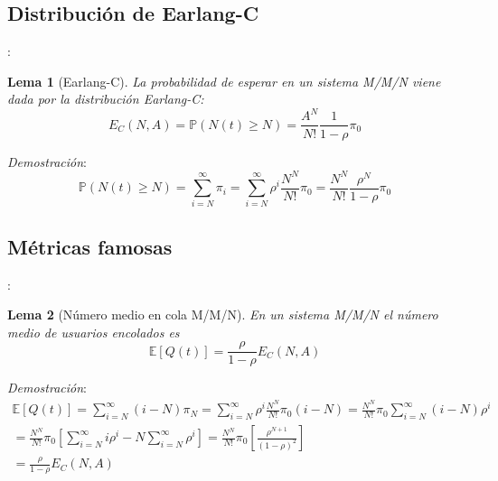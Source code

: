 \documentclass[xcolor={x11names}]{beamer}
\newtheorem{lema}{Lema}[section]
\begin{document}
\subsection{Distribución de Earlang-C}
\begin{frame}{\secname: \subsecname}
    \begin{lema}[Earlang-C]
        La probabilidad de esperar en un
        sistema M/M/N viene dada por
        la distribución Earlang-C:
        \begin{equation}
            E_C(N,A)=\mathbb{P}(N(t)\geq N)
            = \frac{A^N}{N!}\frac{1}{1-\rho}\pi_0
        \end{equation}
    \end{lema}
    \begin{figure}
        \resizebox{!}{.2\textwidth}{%
            
        }
    \end{figure}
    \vfill
    \textit{Demostración}:
        \begin{equation}
            \mathbb{P}(N(t)\geq N)=
            \sum_{i=N}^{\infty}\pi_i
            = \sum_{i=N}^{\infty}
            \rho^i \frac{N^N}{N!}\pi_0
            = \frac{N^N}{N!}\frac{\rho^N}{1-\rho}\pi_0
        \end{equation}
\end{frame}




\subsection{Métricas famosas}
\begin{frame}{\secname: \subsecname}
    \begin{lema}[Número medio en cola M/M/N]
        En un sistema M/M/N el número medio
        de usuarios encolados es
        \begin{equation}
            \mathbb{E}[Q(t)]=
            \frac{\rho}{1-\rho}
            E_C(N,A)
        \end{equation}
    \end{lema}
    \vfill
    \textit{Demostración}:
    \begin{multline*}
        \mathbb{E}[Q(t)]=\sum_{i=N}^\infty
        (i-N)\pi_N=
        \sum_{i=N}^\infty \rho^i \frac{N^N}{N!}
        \pi_0(i-N)=
        \frac{N^N}{N!}\pi_0
        \sum_{i=N}^\infty(i-N)\rho^i\\
        = 
        \frac{N^N}{N!}\pi_0
        \left[
            \sum_{i=N}^\infty
            i\rho^i - N\sum_{i=N}^\infty
            \rho^i
        \right]
        = 
        \frac{N^N}{N!}\pi_0
        \left[
            \frac{\rho^{N+1}}{(1-\rho)^2}
        \right]\\
        = \frac{\rho}{1-\rho}E_C(N,A)
    \end{multline*}
\end{frame}
\end{document}
